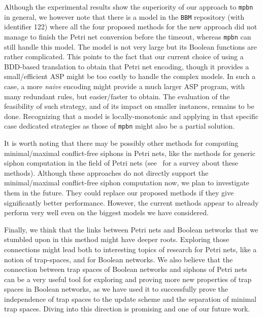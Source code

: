 \documentclass[preprint,12pt]{elsarticle}
\begin{document}
Although the experimental results show the superiority of our approach to \texttt{mpbn} in general, we however note that there is a model in the \texttt{BBM} repository (with identifier 122) where all the four proposed methods for the new approach did not manage to finish the Petri net conversion before the timeout, whereas \texttt{mpbn} can still handle this model.
The model is not very large but its Boolean functions are rather complicated.
This points to the fact that our current choice of using a BDD-based translation to obtain that Petri net encoding, though it provides a small/efficient ASP might be too costly to handle the complex models.
In such a case, a more \emph{naive} encoding might provide a much larger ASP program, with many redundant rules, but easier/faster to obtain.
The evaluation of the feasibility of such strategy, and of its impact on smaller instances, remains to be done.
Recognizing that a model is locally-monotonic and applying in that specific case dedicated strategies as those of \texttt{mpbn} might also be a partial solution.

It is worth noting that there may be possibly other methods for computing minimal/maximal conflict-free siphons in Petri nets, like the methods for generic siphon computation in the field of Petri nets (see~\cite{DBLP:journals/isci/LiuB16} for a survey about these methods).
Although these approaches do not directly support the minimal/maximal conflict-free siphon computation now, we plan to investigate them in the future.
They could replace our proposed methods if they give significantly better performance.
However, the current methods appear to already perform very well even on the biggest models we have considered.

Finally, we think that the links between Petri nets and Boolean networks that we stumbled upon in this method might have deeper roots. 
Exploring those connections might lead both to interesting topics of research for Petri nets, like a notion of trap-spaces, and for Boolean networks.
We also believe that the connection between trap spaces of Boolean networks and siphons of Petri nets can be a very useful tool for exploring and proving more new properties of trap spaces in Boolean networks, as we have used it to successfully prove the independence of trap spaces to the update scheme and the separation of minimal trap spaces.
Diving into this direction is promising and one of our future work.

\end{document}
